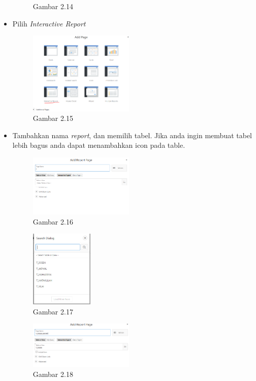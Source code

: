 \documentclass{article}
\begin{document}
\begin{itemize}
\begin{figure}[ht]
                    \caption{Gambar 2.14}
                \end{figure}
            \item Pilih \textit{Interactive Report}
                \begin{figure}[ht]
                    \centerline{\includegraphics[width=5cm]{Capture16.PNG}}
                    \caption{Gambar 2.15}
                \end{figure}
            \newpage
            \item Tambahkan nama \textit{report}, dan memilih tabel. Jika anda ingin membuat tabel lebih bagus anda dapat menambahkan icon pada table.
                \begin{figure}[ht]
                    \centerline{\includegraphics[width=5cm]{Capture17.PNG}}
                    \caption{Gambar 2.16}
                \end{figure}
                \begin{figure}[ht]
                    \centerline{\includegraphics[width=3cm]{Capture19.PNG}}
                    \caption{Gambar 2.17}
                \end{figure}
                \begin{figure}[ht]
                    \centerline{\includegraphics[width=5cm]{Capture18.PNG}}
                    \caption{Gambar 2.18}
                \end{figure}
            \newpage
            

\end{itemize}
\end{document}
